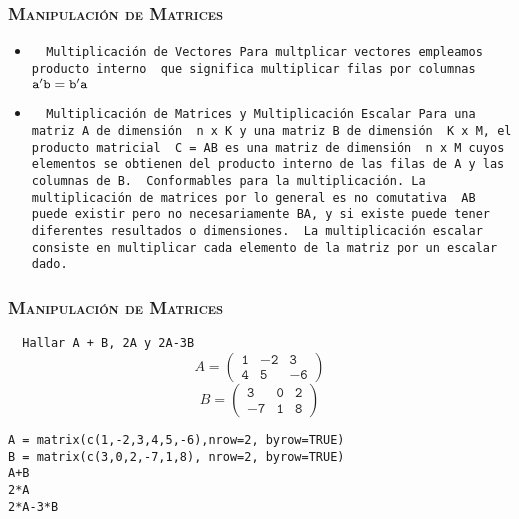 \documentclass[16.5pt]{beamer}
\begin{document}
{
\begin{frame}
\frametitle{\textsc{\textbf{Manipulación de Matrices}}}
\hspace*{-5mm}
\vspace*{-5mm} 
\vspace{0.3cm}

\begin{itemize}

\item \texttt{ {\color{blue} Multiplicación de Vectores} Para multplicar vectores empleamos {\color{black} producto interno } que significa multiplicar filas por columnas} $ \color{black} \mathtt{a'b = b'a}$
\item \texttt{ {\color{blue} Multiplicación de Matrices y Multiplicación Escalar} Para una matriz A de dimensión  {\color{blue} n x K} y una matriz B de dimensión  {\color{blue} K x M}, el producto matricial  {\color{blue} C = AB} es una matriz de dimensión   {\color{blue} n x M} cuyos elementos se obtienen del producto interno de las filas de A y las columnas de B.  {\color{blue} Conformables para la multiplicación}. La multiplicación de matrices por lo general es no comutativa  {\color{blue} AB puede existir pero no necesariamente BA, y si existe puede tener diferentes resultados o dimensiones}.  {\color{red} La multiplicación escalar} consiste en multiplicar cada elemento de la matriz por un escalar dado.}
\end{itemize}

\end{frame}
}

{
\begin{frame}
\frametitle{\textsc{\textbf{Manipulación de Matrices}}}
\hspace*{-5mm}
\vspace*{-5mm} 
\vspace{0.3cm}


\texttt{  {\color{red} Hallar A + B, 2A y 2A-3B} }
$$A= \mathtt{\begin{pmatrix} 1 & -2 & 3  \\ 4 & 5 & -6   \end{pmatrix}}$$
$$B= \mathtt{\begin{pmatrix} 3 & 0 & 2  \\ -7 & 1 & 8   \end{pmatrix}}$$

\begin{lstlisting}
A = matrix(c(1,-2,3,4,5,-6),nrow=2, byrow=TRUE)
B = matrix(c(3,0,2,-7,1,8), nrow=2, byrow=TRUE)
A+B
2*A
2*A-3*B
\end{lstlisting}


\end{frame}
}
\end{document}
